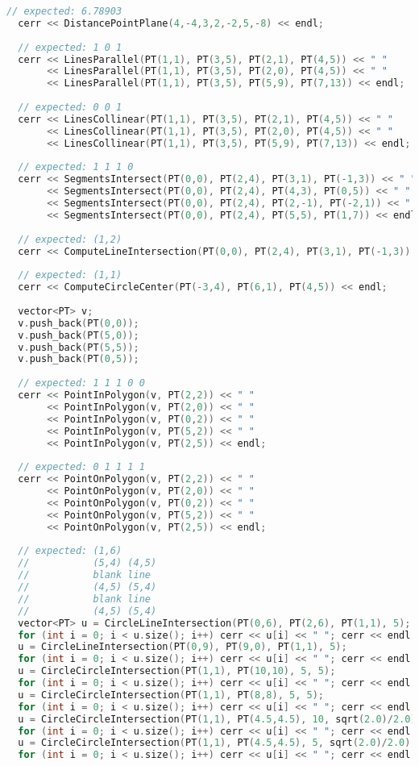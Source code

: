\begin{lstlisting}[language=C++]
  // expected: 6.78903
  cerr << DistancePointPlane(4,-4,3,2,-2,5,-8) << endl;
  
  // expected: 1 0 1
  cerr << LinesParallel(PT(1,1), PT(3,5), PT(2,1), PT(4,5)) << " "
       << LinesParallel(PT(1,1), PT(3,5), PT(2,0), PT(4,5)) << " "
       << LinesParallel(PT(1,1), PT(3,5), PT(5,9), PT(7,13)) << endl;
  
  // expected: 0 0 1
  cerr << LinesCollinear(PT(1,1), PT(3,5), PT(2,1), PT(4,5)) << " "
       << LinesCollinear(PT(1,1), PT(3,5), PT(2,0), PT(4,5)) << " "
       << LinesCollinear(PT(1,1), PT(3,5), PT(5,9), PT(7,13)) << endl;
  
  // expected: 1 1 1 0
  cerr << SegmentsIntersect(PT(0,0), PT(2,4), PT(3,1), PT(-1,3)) << " "
       << SegmentsIntersect(PT(0,0), PT(2,4), PT(4,3), PT(0,5)) << " "
       << SegmentsIntersect(PT(0,0), PT(2,4), PT(2,-1), PT(-2,1)) << " "
       << SegmentsIntersect(PT(0,0), PT(2,4), PT(5,5), PT(1,7)) << endl;
  
  // expected: (1,2)
  cerr << ComputeLineIntersection(PT(0,0), PT(2,4), PT(3,1), PT(-1,3)) << endl;
  
  // expected: (1,1)
  cerr << ComputeCircleCenter(PT(-3,4), PT(6,1), PT(4,5)) << endl;
  
  vector<PT> v; 
  v.push_back(PT(0,0));
  v.push_back(PT(5,0));
  v.push_back(PT(5,5));
  v.push_back(PT(0,5));
  
  // expected: 1 1 1 0 0
  cerr << PointInPolygon(v, PT(2,2)) << " "
       << PointInPolygon(v, PT(2,0)) << " "
       << PointInPolygon(v, PT(0,2)) << " "
       << PointInPolygon(v, PT(5,2)) << " "
       << PointInPolygon(v, PT(2,5)) << endl;
  
  // expected: 0 1 1 1 1
  cerr << PointOnPolygon(v, PT(2,2)) << " "
       << PointOnPolygon(v, PT(2,0)) << " "
       << PointOnPolygon(v, PT(0,2)) << " "
       << PointOnPolygon(v, PT(5,2)) << " "
       << PointOnPolygon(v, PT(2,5)) << endl;
  
  // expected: (1,6)
  //           (5,4) (4,5)
  //           blank line
  //           (4,5) (5,4)
  //           blank line
  //           (4,5) (5,4)
  vector<PT> u = CircleLineIntersection(PT(0,6), PT(2,6), PT(1,1), 5);
  for (int i = 0; i < u.size(); i++) cerr << u[i] << " "; cerr << endl;
  u = CircleLineIntersection(PT(0,9), PT(9,0), PT(1,1), 5);
  for (int i = 0; i < u.size(); i++) cerr << u[i] << " "; cerr << endl;
  u = CircleCircleIntersection(PT(1,1), PT(10,10), 5, 5);
  for (int i = 0; i < u.size(); i++) cerr << u[i] << " "; cerr << endl;
  u = CircleCircleIntersection(PT(1,1), PT(8,8), 5, 5);
  for (int i = 0; i < u.size(); i++) cerr << u[i] << " "; cerr << endl;
  u = CircleCircleIntersection(PT(1,1), PT(4.5,4.5), 10, sqrt(2.0)/2.0);
  for (int i = 0; i < u.size(); i++) cerr << u[i] << " "; cerr << endl;
  u = CircleCircleIntersection(PT(1,1), PT(4.5,4.5), 5, sqrt(2.0)/2.0);
  for (int i = 0; i < u.size(); i++) cerr << u[i] << " "; cerr << endl;
  

\end{lstlisting}
